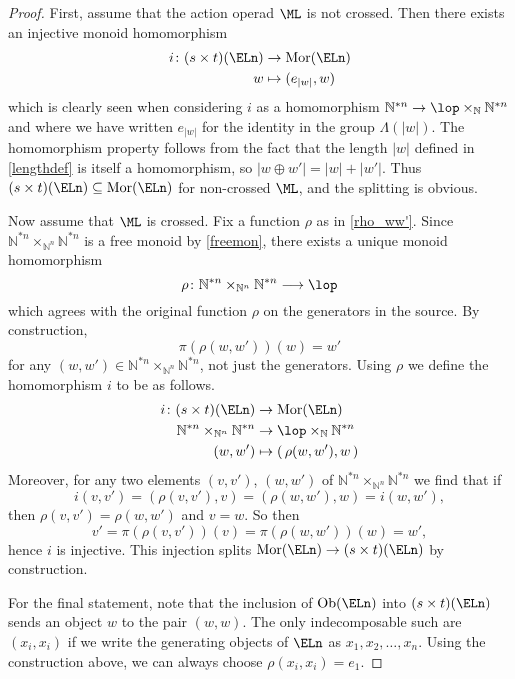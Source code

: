 \begin{proof}
First, assume that the action operad $\ML$ is not crossed. Then there exists an injective monoid homomorphism
  \begin{align*}
    i \colon (s \times t)(\ELn) &\rightarrow \mathrm{Mor}(\ELn) \\
    w & \mapsto (e_{|w|}, w)
  \end{align*}
which is clearly seen when considering $i$ as a homomorphism $\mathbb{N}^{\ast n} \rightarrow \lop \times_{\mathbb{N}} \mathbb{N}^{\ast n} $ and where we have written $e_{|w|}$ for the identity in the group $\Lambda(|w|)$. The homomorphism property follows from the fact that the length $|w|$ defined in \cref{lengthdef} is itself a homomorphism, so $|w \oplus w'| = |w|+|w'|$. Thus $(s \times t)(\ELn) \subseteq \mathrm{Mor}(\ELn)$ for non-crossed $\ML$, and the splitting is obvious.

Now assume that $\ML$ is crossed. Fix a function $\rho$ as in \cref{rho_ww'}. Since $\mathbb{N}^{\ast n} \times_{\mathbb{N}^n} \mathbb{N}^{\ast n}$ is a free monoid  by \cref{freemon}, there exists a unique monoid homomorphism
  \[
    \rho \colon \mathbb{N}^{\ast n} \times_{\mathbb{N}^n} \mathbb{N}^{\ast n} \longrightarrow \lop
  \]
which agrees with the original function $\rho$ on the generators in the source. By construction,
  \[
    \pi(\rho(w, w'))(w) = w'
  \]
for any $(w, w') \in\mathbb{N}^{\ast n} \times_{\mathbb{N}^n} \mathbb{N}^{\ast n}$, not just the generators. Using $\rho$ we define the homomorphism $i$ to be as follows.
  \begin{align*}
		i \colon (s \times t)(\ELn) &\rightarrow \mathrm{Mor}(\ELn) \\
		\mathbb{N}^{\ast n} \times_{\mathbb{N}^n} \mathbb{N}^{\ast n} &\rightarrow \lop \times_{\mathbb{N}} \mathbb{N}^{\ast n} \\
		(w, w') &\mapsto ( \, \rho(w, w'), w \, )
	\end{align*}
Moreover, for any two elements $(v, v')$, $(w, w')$ of $\mathbb{N}^{\ast n} \times_{\mathbb{N}^n} \mathbb{N}^{\ast n}$ we find that if
  \[
    i(v,v') = (\rho(v,v'),v) = (\rho(w,w'),w) = i(w,w'),
  \]
then $\rho(v,v') = \rho(w,w')$ and $v = w$. So then
  \[
    v' = \pi(\rho(v,v'))(v) = \pi(\rho(w,w'))(w) = w',
  \]
hence $i$ is injective. This injection splits $\mathrm{Mor}(\ELn) \rightarrow (s \times t)(\ELn)$ by construction.

For the final statement, note that the inclusion of $\mathrm{Ob}(\ELn)$ into $(s \times t)(\ELn)$ sends an object $w$ to the pair $(w,w)$. The only indecomposable such are $(x_i, x_i)$ if we write the generating objects of $\ELn$ as $x_1, x_2, \ldots, x_n$. Using the construction above, we can always choose $\rho(x_i, x_i) = e_1$.
\end{proof}

